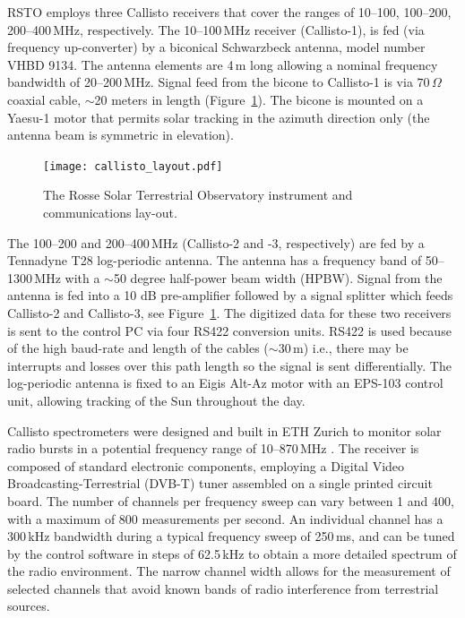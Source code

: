 RSTO employs three Callisto receivers that cover the ranges of 10--100, 100--200, 200--400\,MHz, respectively. The 10--100\,MHz receiver (Callisto-1), is fed (via frequency up-converter) by a biconical Schwarzbeck antenna, model number VHBD 9134. The antenna elements are 4\,m long allowing a nominal frequency bandwidth of 20--200\,MHz. Signal feed from the bicone to Callisto-1 is via $70\,\Omega$ coaxial cable, $\sim$20 meters in length (Figure~\ref{fig:rsto_layout}). The bicone is mounted on a Yaesu-1 motor that permits solar tracking in the azimuth direction only (the antenna beam is symmetric in elevation). 
\begin{figure}
    \centering
\texttt{[image: callisto\_layout.pdf]}
\caption[RSTO Instrumental Setup]{The Rosse Solar Terrestrial Observatory instrument and communications lay-out.}
\label{fig:rsto_layout}
\end{figure}

The 100--200 and 200--400\,MHz (Callisto-2 and -3, respectively) are fed by a Tennadyne T28 log-periodic antenna. The antenna has a frequency band of 50--1300\,MHz with a $\sim$50 degree half-power beam width (HPBW). Signal from the antenna is fed into a 10 dB pre-amplifier followed by a signal splitter which feeds Callisto-2 and Callisto-3, see Figure~\ref{fig:rsto_layout}. The digitized data for these two receivers is sent to the control PC via four RS422 conversion units. RS422 is used because of the high baud-rate and length of the cables ($\sim30$\,m) i.e., there may be interrupts and losses over this path length so the signal is sent differentially. The log-periodic antenna is fixed to an Eigis Alt-Az motor with an EPS-103 control unit, allowing tracking of the Sun throughout the day. 

Callisto spectrometers were designed and built in ETH Zurich to monitor solar radio bursts in a {\color{blue} potential} frequency range of 10--870\,MHz \citep{Benz2005}. The receiver is composed of standard electronic components, employing a Digital Video Broadcasting-Terrestrial (DVB-T) tuner assembled on a single printed circuit board. The number of channels per frequency sweep can vary between 1 and 400, with a maximum of 800 measurements per second. An individual channel has a 300\,kHz bandwidth during a typical frequency sweep of 250\,ms, and can be tuned by the control software in steps of 62.5\,kHz to obtain a more detailed spectrum of the radio environment. The narrow channel width allows for the measurement of selected channels that avoid known bands of radio interference from terrestrial sources.

